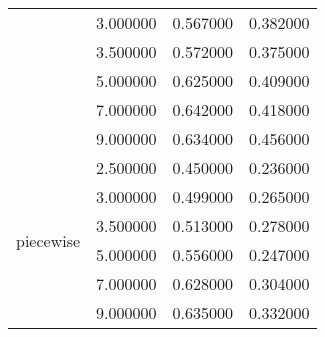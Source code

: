 \begin{tabular}{llrr}
 & 3.000000 & 0.567000 & 0.382000 \\
 & 3.500000 & 0.572000 & 0.375000 \\
 & 5.000000 & 0.625000 & 0.409000 \\
 & 7.000000 & 0.642000 & 0.418000 \\
 & 9.000000 & 0.634000 & 0.456000 \\
\cline{1-4}
\multirow[t]{6}{*}{piecewise} & 2.500000 & 0.450000 & 0.236000 \\
 & 3.000000 & 0.499000 & 0.265000 \\
 & 3.500000 & 0.513000 & 0.278000 \\
 & 5.000000 & 0.556000 & 0.247000 \\
 & 7.000000 & 0.628000 & 0.304000 \\
 & 9.000000 & 0.635000 & 0.332000 \\
\cline{1-4}
\bottomrule
\end{tabular}
